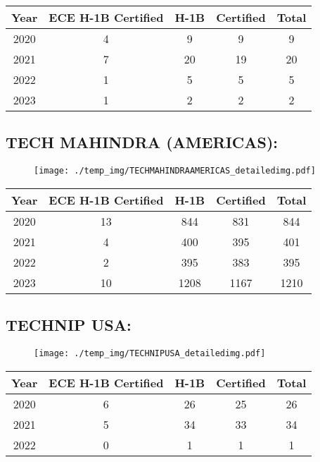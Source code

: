 \documentclass{article}%
\begin{document}
%
\begin{longtable}{c|c|c|c|c}%
\hline%
Year&ECE H{-}1B Certified&H{-}1B&Certified&Total\\%
\hline%
2020&4&9&9&9\\%
\hline%
2021&7&20&19&20\\%
\hline%
2022&1&5&5&5\\%
\hline%
2023&1&2&2&2\\%
\hline%
\end{longtable}

%
\newpage%
\subsection{TECH MAHINDRA (AMERICAS):}%
\label{subsec:TECHMAHINDRA(AMERICAS)}%
\label{TECHMAHINDRAAMERICASdetailed}%


\begin{figure}[htbp]%
\centering%
\texttt{[image: ./temp\_img/TECHMAHINDRAAMERICAS\_detailedimg.pdf]}%
\end{figure}

%
\begin{longtable}{c|c|c|c|c}%
\hline%
Year&ECE H{-}1B Certified&H{-}1B&Certified&Total\\%
\hline%
2020&13&844&831&844\\%
\hline%
2021&4&400&395&401\\%
\hline%
2022&2&395&383&395\\%
\hline%
2023&10&1208&1167&1210\\%
\hline%
\end{longtable}

%
\newpage%
\subsection{TECHNIP USA:}%
\label{subsec:TECHNIPUSA}%
\label{TECHNIPUSAdetailed}%


\begin{figure}[htbp]%
\centering%
\texttt{[image: ./temp\_img/TECHNIPUSA\_detailedimg.pdf]}%
\end{figure}

%
\begin{longtable}{c|c|c|c|c}%
\hline%
Year&ECE H{-}1B Certified&H{-}1B&Certified&Total\\%
\hline%
2020&6&26&25&26\\%
\hline%
2021&5&34&33&34\\%
\hline%
2022&0&1&1&1\\%
\hline%
\end{longtable}
\end{document}
